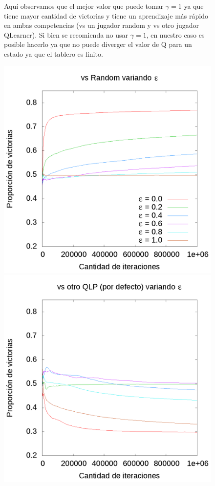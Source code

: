 \documentclass[10pt, a4paper]{article}
\begin{document}
\begin{figure}[H]
\begin{minipage}[c]{1\textwidth}
	\caption{Aquí observamos que el mejor valor que puede tomar $\gamma = 1$ ya que tiene mayor cantidad de victorias y tiene un aprendizaje más rápido en ambas competencias (vs un jugador random y vs otro jugador QLearner). Si bien se recomienda no usar $\gamma = 1$, en nuestro caso es posible hacerlo ya que no puede diverger el valor de Q para un estado ya que el tablero es finito. }
  \end{minipage}
\end{figure}
\begin{figure}[H]
  \begin{minipage}[c]{1\textwidth}
	\includegraphics[scale=0.2]{EpsilonR.png}
	\includegraphics[scale=0.2]{EpsilonQ.png}

\end{minipage}
\end{figure}
\end{document}
